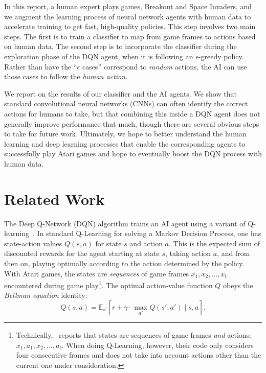 \documentclass[letterpaper, 10pt, conference]{ieeeconf}
\begin{document}
In this report, a human expert plays games, Breakout and Space Invaders, and we
augment the learning process of neural network agents with human data to
accelerate training to get fast, high-quality policies. This step involves two
main steps. The first is to train a classifier to map from game frames to
actions based on human data. The second step is to incorporate the classifier
during the exploration phase of the DQN agent, when it is following an
$\epsilon$-greedy policy. Rather than have the ``$\epsilon$ cases'' correspond
to \emph{random} actions, the AI can use those cases to follow the \emph{human
action}.

We report on the results of our classifier and the AI agents. We show that
standard convolutional neural networks (CNNs) can often identify the correct
actions for humans to take, but that combining this inside a DQN agent does not
generally improve performance that much, though there are several obvious
steps to take for future work. Ultimately, we hope to better understand the
human learning and deep learning processes that enable the corresponding
agents to successfully play Atari games and hope to eventually boost the DQN
process with human data.


\section{Related Work}\label{sec:related_work}

The Deep Q-Network (DQN) algorithm trains an AI agent using a variant of
Q-learning~\cite{Sutton_1998}. In standard Q-Learning for solving a Markov
Decision Process, one has state-action values $Q(s,a)$ for state $s$ and action
$a$. This is the expected sum of discounted rewards for the agent starting at
state $s$, taking action $a$, and from then on, playing optimally according to
the action determined by the policy.  With Atari games, the states are
\emph{sequences} of game frames $x_1,x_2,\ldots,x_t$ encountered during game
play\footnote{Technically,~\cite{mnih-dqn-2015} reports that states are
sequences of game frames \emph{and} actions: $x_1,a_1,x_2,\ldots,a_t$. When
doing Q-Learning, however, their code only considers four consecutive frames and
does not take into account actions other than the current one under
consideration.}. The optimal action-value function $Q$ obeys the \emph{Bellman
equation} identity: 
\begin{equation}\label{eq:bellman}
Q(s,a) = \mathbb{E}_{s'}\left[r + \gamma \cdot \max_{a'} Q(s',a') \mid s,a \right].
\end{equation}
\end{document}
